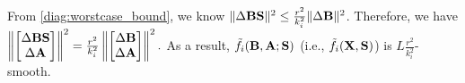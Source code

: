 \documentclass{article} %
\theoremstyle{plain}
\theoremstyle{definition}
\begin{document}
From \eqref{diag:worstcase_bound}, we know \(\|\Delta {\bf B} {\bf S}\|^2 \leq \frac{r^2}{k_i^2} \|\Delta {\bf B}\|^2\).
Therefore, we have
 \(\left \| \begin{bmatrix}
       {\Delta {\bf B}} {\bf S}\\
        \Delta {\bf A}
    \end{bmatrix} \right \|^2 = \frac{r^2}{k_i^2}\left \| \begin{bmatrix}
       \Delta {\bf B} \\
        \Delta {\bf A}
    \end{bmatrix} \right \|^2.
    \)
As a result, \(\tilde{f}_{i} ({\bf B},{\bf A}; {\bf S})\) (i.e., \(\tilde{f}_{i} ({\bf X}, {\bf S})\)) is \(L \frac{r^2}{k_i^2}\)-smooth. 
\end{document}

